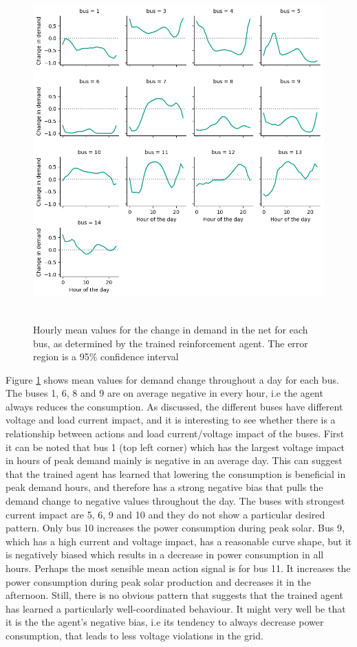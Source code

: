 \documentclass[class=book, crop=false, 11pt]{standalone}
\begin{document}
\begin{figure}[h]
    \center
\includegraphics[height=13cm, width=12cm]{figures/config1_action_bus.png}
    \caption[size = 9]{Hourly mean values for the change in demand in the net for each bus, as determined by the trained reinforcement agent. The error region is a 95\% confidence interval}
    \label{fig:discussion:config1_action_bus}
\end{figure}

Figure \ref{fig:discussion:config1_action_bus} shows mean values for demand change throughout a day for each bus.  The buses 1, 6, 8 and 9 are on average negative in every hour, i.e the agent always reduces the consumption. As discussed, the different buses have different voltage and load current impact, and it is interesting to see whether there is a relationship between actions and load current/voltage impact of the buses. First it can be noted that bus 1 (top left corner) which has the largest voltage impact in hours of peak demand mainly is negative in an average day. This can suggest that the trained agent has learned that lowering the consumption is beneficial in peak demand hours, and therefore has a strong negative bias that pulls the demand change to negative values throughout the day. The buses with strongest current impact are 5, 6, 9 and 10 and they do not show a particular desired pattern. Only bus 10 increases the power consumption during peak solar. Bus 9, which has a high current and voltage impact, has a reasonable curve shape, but it is negatively biased which results in a decrease in power consumption in all hours. Perhaps the most sensible mean action signal is for bus 11. It increases the power consumption during peak solar production and decreases it in the afternoon. Still, there is no obvious pattern that suggests that the trained agent has learned a particularly well-coordinated behaviour. It might very well be that it is the the agent's negative bias, i.e its tendency to always decrease power consumption, that leads to less voltage violations in the grid.
\end{document}
